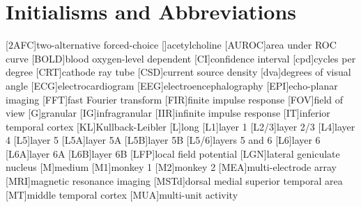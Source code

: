     \chapter*{Initialisms and Abbreviations}
    \begin{acronym}[AUROC]
        [$2$AFC]{two-alternative forced-choice}
        []{acetylcholine}
        [AUROC]{area under \acl{ROC} curve}
        [BOLD]{blood oxygen-level dependent}
        [CI]{confidence interval}
        [cpd]{cycles per degree}
        [CRT]{cathode ray tube}
        [CSD]{current source density}
        [dva]{degrees of visual angle}
        [ECG]{electrocardiogram}
        [EEG]{electroencephalography}
        [EPI]{echo-planar imaging}
        [FFT]{fast Fourier transform}
        [FIR]{finite impulse response}
        [FOV]{field of view}
        [G]{granular}
        [IG]{infragranular}
        [IIR]{infinite impulse response}
        [IT]{inferior temporal cortex}
        [KL]{Kullback-Leibler}
        [L]{long}
        [L1]{layer 1}
        [L2/3]{layer 2/3}
        [L4]{layer 4}
        [L5]{layer 5}
        [L5A]{layer 5A}
        [L5B]{layer 5B}
        [L5/6]{layers 5 and 6}
        [L6]{layer 6}
        [L6A]{layer 6A}
        [L6B]{layer 6B}
        [LFP]{local field potential}
        [LGN]{lateral geniculate nucleus}
        [M]{medium}
        [M1]{monkey 1}
        [M2]{monkey 2}
        [MEA]{multi-electrode array}
        [MRI]{magnetic resonance imaging}
        [MSTd]{dorsal medial superior temporal area}
        [MT]{middle temporal cortex}
        [MUA]{multi-unit activity}

\end{acronym}
